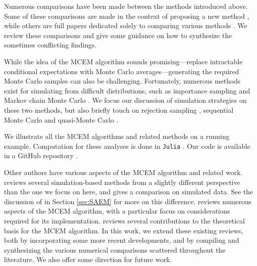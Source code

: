\documentclass[11pt, oneside]{article}   	%
\begin{document}
Numerous comparisons have been made between the methods introduced above. Some of these comparisons are made in the context of proposing a new method \citep[e.g.,][]{Gu98I,Boo99}, while others are full papers dedicated solely to comparing various methods \citep[e.g.,][]{McC97,Boo01}. We review these comparisons and give some guidance on how to synthesize the sometimes conflicting findings. 

While the idea of the MCEM algorithm sounds promising---replace intractable conditional expectations with Monte Carlo averages---generating the required Monte Carlo samples can also be challenging. Fortunately, numerous methods exist for simulating from difficult distributions, such as importance sampling \citep{Rob04} and Markov chain Monte Carlo \citep{Gel13}. We focus our discussion of simulation strategies on these two methods, but also briefly touch on rejection sampling \citep{Rob04}, sequential Monte Carlo \citep{Del06} and quasi-Monte Carlo \citep{Caf98}.


We illustrate all the MCEM algorithms and related methods on a running example. Computation for these analyses is done in \texttt{Julia} \citep{Bez17}. Our code is available in a GitHub repository \citep{Rut23I}.

Other authors have various aspects of the MCEM algorithm and related work. \citet{Cel95} reviews several simulation-based methods from a slightly different perspective than the one we focus on here, and gives a comparison on simulated data. See the discussion of \citet{Cel95} in Section \ref{sec:SAEM} for more on this difference. \citet{Jan05} reviews numerous aspects of the MCEM algorithm, with a particular focus on considerations required for its implementation. \citet{Nea13} reviews several contributions to the theoretical basis for the MCEM algorithm. In this work, we extend these existing reviews, both by incorporating some more recent developments, and by compiling and synthesizing the various numerical comparisons scattered throughout the literature. We also offer some direction for future work.
\end{document}
